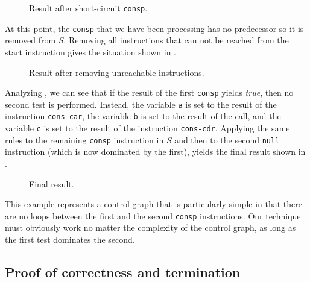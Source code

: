 \begin{figure}
\begin{center}
\end{center}
\caption{\label{fig-rewrite-6}
Result after short-circuit \texttt{consp}.}
\end{figure}

At this point, the \texttt{consp} that we have been processing has no
predecessor so it is removed from $S$.  Removing all instructions that
can not be reached from the start instruction gives the situation
shown in .

\begin{figure}
\begin{center}
\end{center}
\caption{\label{fig-rewrite-7}
Result after removing unreachable instructions.}
\end{figure}

Analyzing , we can see that if the result of the
first \texttt{consp} yields \emph{true}, then no second test is
performed.  Instead, the variable \texttt{a} is set to the result of
the instruction \texttt{cons-car}, the variable \texttt{b} is set to
the result of the call, and the variable \texttt{c} is set to the
result of the instruction \texttt{cons-cdr}.  Applying the same rules
to the remaining \texttt{consp} instruction in $S$ and then to the
second \texttt{null} instruction (which is now dominated by the
first), yields the final result shown in  .

\begin{figure}
\begin{center}
\end{center}
\caption{\label{fig-rewrite-8}
Final result.}
\end{figure}

This example represents a control graph that is particularly simple in
that there are no loops between the first and the second
\texttt{consp} instructions.  Our technique must obviously work no
matter the complexity of the control graph, as long as the first test
dominates the second.

\subsection{Proof of correctness and termination}
